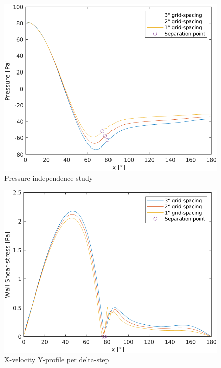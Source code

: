 \documentclass[12pt]{article}
\begin{document}
        \begin{figure}[!ht]
                \includegraphics[width=\textwidth]{Pressure_Independence.png}
                \centering
                \caption{Pressure independence study}
                \label{fig:pression_ind}
        \end{figure}

        \begin{figure}[!ht]
                \includegraphics[width=\textwidth]{WallShearStress_Independence.png}
                \centering
                \caption{X-velocity Y-profile per delta-step}
                \label{fig:wall_ind}
        \end{figure}
\end{document}
